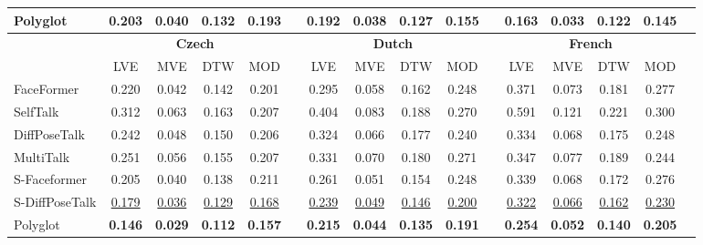 \documentclass[a4paper, 10pt, conference]{ieeeconf}      %
\begin{document}
\begin{table}[ht!]
{\begin{tabular}{@{}l@{\hspace{0.1cm}}ccccccccccccccc@{}}
        \midrule

        Polyglot & \textbf{0.203} & \textbf{0.040} & \textbf{0.132} & \textbf{0.193} && \textbf{0.192} & \textbf{0.038} & \textbf{0.127} & \textbf{0.155} && \textbf{0.163} & \textbf{0.033} & \textbf{0.122} & \textbf{0.145} \\
        
        \midrule
        \midrule

        & \multicolumn{4}{c}{\textbf{Czech}} & \phantom{abc} & \multicolumn{4}{c}{\textbf{Dutch}} &
        \phantom{abc} & \multicolumn{4}{c}{\textbf{French}} 
        \\
        \cmidrule{2-5} \cmidrule{7-10} \cmidrule{12-15} 
         & LVE  & MVE  & DTW  & MOD  && LVE  & MVE  & DTW  & MOD  && LVE  & MVE  & DTW  & MOD \\
        \midrule
        FaceFormer & 0.220 & 0.042 & 0.142 & 0.201 && 0.295 & 0.058 & 0.162 & 0.248 && 0.371 & 0.073 & 0.181 & 0.277  \\
        
        SelfTalk  & 0.312 & 0.063 & 0.163 & 0.207 && 0.404 & 0.083 & 0.188 & 0.270 && 0.591 & 0.121 & 0.221 & 0.300  \\

        DiffPoseTalk & 0.242 & 0.048 & 0.150 & 0.206 && 0.324 & 0.066 & 0.177 & 0.240 && 0.334 & 0.068 & 0.175 & 0.248  \\

        MultiTalk & 0.251 & 0.056 & 0.155 & 0.207 && 0.331 & 0.070 & 0.180 & 0.271 && 0.347 & 0.077 & 0.189 & 0.244 \\
        
        \midrule

        S-Faceformer & 0.205 & 0.040 & 0.138 & 0.211 && 0.261 & 0.051 & 0.154 & 0.248 && 0.339 & 0.068 & 0.172 & 0.276 \\

        S-DiffPoseTalk & \underline{0.179} & \underline{0.036} & \underline{0.129} & \underline{0.168} && \underline{0.239} & \underline{0.049} & \underline{0.146} & \underline{0.200} && \underline{0.322} & \underline{0.066} & \underline{0.162} & \underline{0.230} \\
        
        \midrule

        Polyglot & \textbf{0.146} & \textbf{0.029} & \textbf{0.112} & \textbf{0.157} && \textbf{0.215} & \textbf{0.044} & \textbf{0.135} & \textbf{0.191} && \textbf{0.254} & \textbf{0.052} & \textbf{0.140} & \textbf{0.205} \\
        

\end{tabular}}
\end{table}
\end{document}
